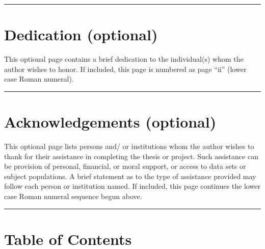 \documentclass[openany]{book}
\begin{document}
\begin{center}\rule{0.5\linewidth}{0.5pt}\end{center}

\hypertarget{dedication-optional}{%
\section{Dedication (optional)}\label{dedication-optional}}

This optional page contains a brief dedication to the individual(s) whom the author wishes to honor. If included, this page is numbered as page ``ii'' (lower case Roman numeral).

\begin{center}\rule{0.5\linewidth}{0.5pt}\end{center}

\hypertarget{acknowledgements-optional}{%
\section{Acknowledgements (optional)}\label{acknowledgements-optional}}

This optional page lists persons and/ or institutions whom the author wishes to thank for their assistance in completing the thesis or project. Such assistance can be provision of personal, financial, or moral support, or access to data sets or subject populations. A brief statement as to the type of assistance provided may follow each person or institution named. If included, this page continues the lower case Roman numeral sequence begun above.

\begin{center}\rule{0.5\linewidth}{0.5pt}\end{center}

\hypertarget{table-of-contents}{%
\section{Table of Contents}\label{table-of-contents}}
\end{document}
